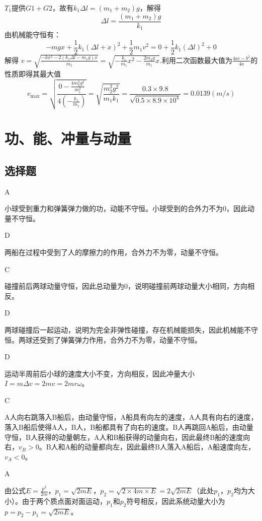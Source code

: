 \documentclass[b5paper,opensource,sourcefont,parskip]{qyxf-book}
\begin{document}

\solve $T_1$提供$G1+G2$，故有$k_1\Delta l=(m_1+m_2)g$，解得
\[\Delta l=\frac{(m_1+m_2)g}{k_1}\]
由机械能守恒有：
\[-mgx+\frac{1}{2}k_1(\Delta l+x)^2+\frac{1}{2}m_1v^2=0+\frac{1}{2}k_1(\Delta l)^2+0\]
解得
$v=\sqrt{\frac{-kx^2-2(k_1\Delta l-m_1g)x}{m_1}}=\sqrt{-\frac{k_1}{m_1}x^2-\frac{2m_2g}{m_1}x}$.利用二次函数最大值为$\frac{4ac-b^2}{4a}$的性质即得其最大值
\[
v_{\text{max}}=\sqrt{\frac{0-\frac{4m_2^2g^2}{m_1^2}}{4\left(-\frac{k_1}{m_1}\right)}}=\sqrt{\frac{m_2^2g^2}{m_1k_1}}=\frac{0.3\times 9.8}{\sqrt{0.5\times 8.9\times 10^4}}=0.0139(m/s)
\]



\chapter{功、能、冲量与动量}
\section{选择题}

A

\solve 小球受到重力和弹簧弹力做的功，动能不守恒。小球受到的合外力不为0，因此动量不守恒。

D

\solve 两船在过程中受到了人的摩擦力的作用，合外力不为零，动量不守恒。

C

\solve 碰撞前后两球动量守恒，因此总动量为0，说明碰撞前两球动量大小相同，方向相反。

D

\solve 两球碰撞后一起运动，说明为完全非弹性碰撞，存在机械能损失，因此机械能不守恒。两球还受到了弹簧弹力作用，合外力不为零，动量不守恒。

D

\solve 运动半周前后小球的速度大小不变，方向相反，因此冲量大小\(I=m\Delta v=2mv=2mr \omega\)。

C

\solve A人向右跳落入B船后，由动量守恒，A船具有向左的速度，A人具有向右的速度，落入B船后使得A人，B人，B船都具有了向右的速度。B人再跳回A船后，由动量守恒，B人获得的动量朝左，A人和B船获得的动量向右，因此最终B船的速度向右，\(v_B>0\)。B人和A船的动量都向左，因此最终B人落入A船后，A船速度向左，\(v_A<0\)。
			
A

\solve 由公式\(E=\frac{p^2}{2m}\)，\(p_1=\sqrt{2mE}\)，\(p_2=\sqrt{2\times 4m\times E}=2\sqrt{2mE}\)（此处\(p_1\)，\(p_2\)均为大小）。由于两个质点面对面运动，\(p_1\)和\(p_2\)符号相反，因此系统动量大小为\(p=p_2-p_1=\sqrt{2mE}\)。
			
\end{document}
